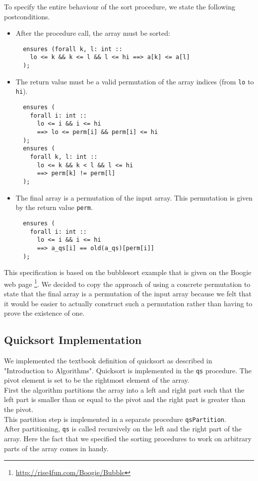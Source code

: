 To specify the entire behaviour of the sort procedure, we state the following postconditions.
\begin{itemize}
\item After the procedure call, the array must be sorted:
  \begin{verbatim}
  ensures (forall k, l: int :: 
    lo <= k && k <= l && l <= hi ==> a[k] <= a[l]
  );
\end{verbatim}

\item The return value must be a valid permutation of the array indices (from \texttt{lo} to \texttt{hi}).
  \begin{verbatim}
  ensures (
    forall i: int :: 
      lo <= i && i <= hi 
      ==> lo <= perm[i] && perm[i] <= hi
  );
  ensures (
    forall k, l: int :: 
      lo <= k && k < l && l <= hi 
      ==> perm[k] != perm[l]
  );
\end{verbatim}

\item The final array is a permutation of the input array. This permutation is given by the return value \texttt{perm}.
  \begin{verbatim}
  ensures (
    forall i: int :: 
      lo <= i && i <= hi 
      ==> a_qs[i] == old(a_qs)[perm[i]]
  );
\end{verbatim}
 
\end{itemize}

This specification is based on the bubblesort example that is 
given on the Boogie web page \footnote{\url{http://rise4fun.com/Boogie/Bubble}}. We decided to 
copy the approach of using a concrete permutation to state that the final array is a permutation of
the input array because we felt that it would be easier to actually construct such a permutation rather
than having to prove the existence of one.

\subsection{Quicksort Implementation}

We implemented the textbook definition of quicksort as described in "Introduction to Algorithms"\cite{Cormen}. 
Quicksort is implemented in the \texttt{qs} procedure. The pivot element is set to be the rightmost element of the array.\\
First the algorithm partitions the array into a left and right part such that the left part is smaller than or equal to the pivot and the right part is greater than the pivot.\\
This partition step is implemented in a separate procedure \texttt{qsPartition}.\\
After partitioning, \texttt{qs} is called recursively on the left and the right part of the array. Here
the fact that we specified the sorting procedures to work on arbitrary parts of the array comes in handy.\\

